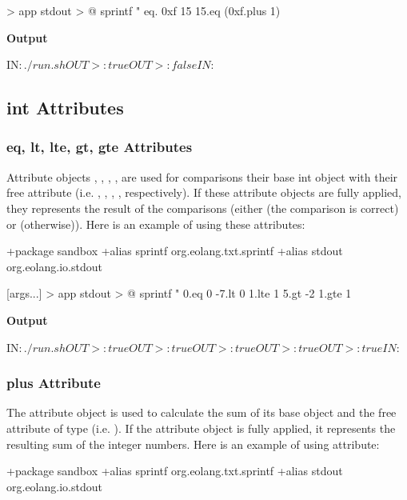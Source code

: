 \documentclass[12pt]{book}
\begin{document}
{\begin{ffcode}
[args...] > app
  stdout > @
  sprintf
    "%
    eq.
      0xf
      15
    15.eq (0xf.plus 1)
\end{ffcode}
\textbf{Output}
\begin{ffcode}
IN$: ./run.sh
OUT>: true
OUT>: false
IN$:
\end{ffcode}

\subsection{int Attributes}

\subsubsection{eq, lt, lte, gt, gte Attributes} \label{subsubsec:comp-attrs}
Attribute objects , , , ,  are used for comparisons their base int object with their  free attribute (i.e. , , , ,  respectively).
If these attribute objects are fully applied, they represents the result of the comparisons (either  (the comparison is correct) or  (otherwise)). Here is an example of using these attributes:

\begin{ffcode}
+package sandbox
+alias sprintf org.eolang.txt.sprintf
+alias stdout org.eolang.io.stdout

[args...] > app
  stdout > @
    sprintf
      "%
      0.eq 0
      -7.lt 0
      1.lte 1
      5.gt -2
      1.gte 1
\end{ffcode}
\textbf{Output}
\begin{ffcode}
IN$: ./run.sh
OUT>: true
OUT>: true
OUT>: true
OUT>: true
OUT>: true
IN$:
\end{ffcode}

\subsubsection{plus Attribute}
The  attribute object is used to calculate the sum of its base  object and the free attribute  of type  (i.e. ).
If the  attribute object is fully applied, it represents the resulting sum of the integer numbers. Here is an example of using  attribute:

\begin{ffcode}
+package sandbox
+alias sprintf org.eolang.txt.sprintf
+alias stdout org.eolang.io.stdout


\end{ffcode}}
\end{document}

